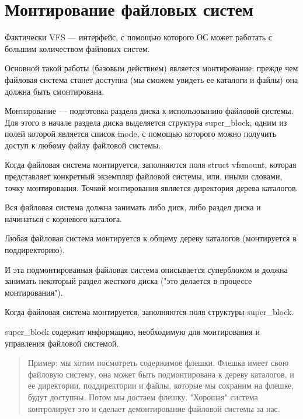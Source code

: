 \section{Монтирование файловых систем}

Фактически VFS — интерфейс, с помощью которого ОС может работать с большим количеством файловых систем.

Основной такой работы (базовым действием) является монтирование: прежде чем файловая система станет доступна (мы сможем увидеть ее каталоги и файлы) она должна быть смонтирована.

Монтирование — подготовка раздела диска к использованию файловой системы. Для этого в начале раздела диска выделяется структура super\_block, одним из полей которой является список inode, с помощью которого можно получить доступ к любому файлу файловой системы.

Когда файловая система монтируется, заполняются поля struct vfsmount, которая представляет конкретный экземпляр файловой системы, или, иными словами, точку монтирования. Точкой монтирования является директория дерева каталогов.

Вся файловая система должна занимать либо диск, либо раздел диска и начинаться с корневого каталога.

Любая файловая система монтируется к общему дереву каталогов (монтируется в поддиректорию).

И эта подмонтированная файловая система описывается суперблоком и должна занимать некоторый раздел жесткого диска ("это делается в процессе монтирования").

Когда файловая система монтируется, заполняются поля структуры super\_block.

super\_block содержит информацию, необходимую для монтирования и управления файловой системой.

\begin{quote}
Пример: мы хотим посмотреть содержимое флешки. Флешка имеет свою файловую систему, она может быть подмонтирована к дереву каталогов, и ее директории, поддиректории и файлы, которые мы сохраним на флешке, будут доступны. Потом мы достаем флешку. "Хорошая" система контролирует это и сделает демонтирование файловой системы за нас.
\end{quote}

